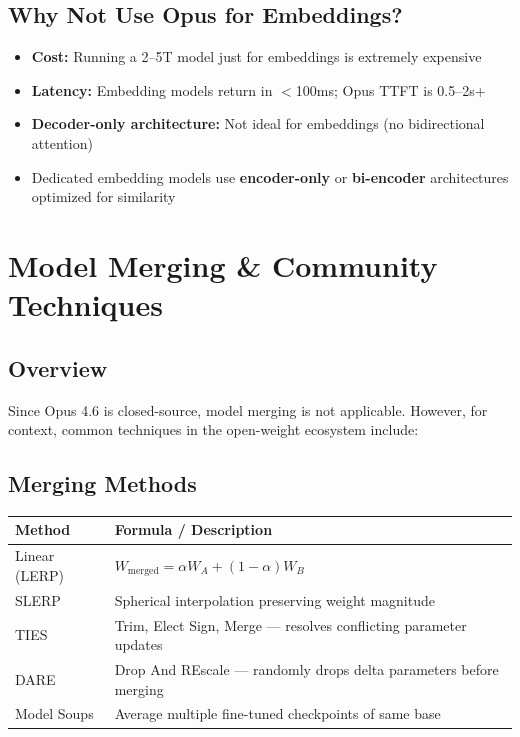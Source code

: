 \documentclass[11pt,a4paper]{article}
\begin{document}
\subsection{Why Not Use Opus for Embeddings?}

\begin{itemize}[itemsep=1pt]
  \item \textbf{Cost:} Running a 2--5T model just for embeddings is extremely expensive
  \item \textbf{Latency:} Embedding models return in $<$100ms; Opus TTFT is 0.5--2s+
  \item \textbf{Decoder-only architecture:} Not ideal for embeddings (no bidirectional attention)
  \item Dedicated embedding models use \textbf{encoder-only} or \textbf{bi-encoder} architectures optimized for similarity
\end{itemize}

\section{Model Merging \& Community Techniques}

\subsection{Overview}

Since Opus 4.6 is closed-source, model merging is not applicable. However, for context, common techniques in the open-weight ecosystem include:

\subsection{Merging Methods}

\begin{center}
\begin{tabular}{lL{9cm}}
\toprule
\textbf{Method} & \textbf{Formula / Description} \\
\midrule
Linear (LERP) & $W_{\text{merged}} = \alpha W_A + (1 - \alpha) W_B$ \\
SLERP & Spherical interpolation preserving weight magnitude \\
TIES & Trim, Elect Sign, Merge --- resolves conflicting parameter updates \\
DARE & Drop And REscale --- randomly drops delta parameters before merging \\
Model Soups & Average multiple fine-tuned checkpoints of same base \\
\bottomrule
\end{tabular}
\end{center}
\end{document}
